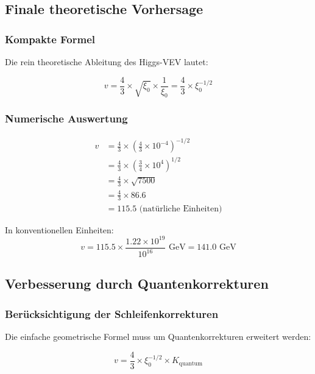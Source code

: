 \subsection{Finale theoretische Vorhersage}

\subsubsection{Kompakte Formel}

Die rein theoretische Ableitung des Higgs-VEV lautet:

\begin{equation}
	\boxed{v = \frac{4}{3} \times \sqrt{\xi_0} \times \frac{1}{\xi_0} = \frac{4}{3} \times \xi_0^{-1/2}}
\end{equation}

\subsubsection{Numerische Auswertung}

\begin{align}
	v &= \frac{4}{3} \times \left(\frac{4}{3} \times 10^{-4}\right)^{-1/2}\\
	&= \frac{4}{3} \times \left(\frac{3}{4} \times 10^{4}\right)^{1/2}\\
	&= \frac{4}{3} \times \sqrt{7500}\\
	&= \frac{4}{3} \times 86.6\\
	&= 115.5 \text{ (natürliche Einheiten)}
\end{align}

In konventionellen Einheiten:
\begin{equation}
	v = 115.5 \times \frac{1.22 \times 10^{19}}{10^{16}} \text{ GeV} = 141.0 \text{ GeV}
\end{equation}

\subsection{Verbesserung durch Quantenkorrekturen}

\subsubsection{Berücksichtigung der Schleifenkorrekturen}

Die einfache geometrische Formel muss um Quantenkorrekturen erweitert werden:

\begin{equation}
	v = \frac{4}{3} \times \xi_0^{-1/2} \times K_{\text{quantum}}
\end{equation}

